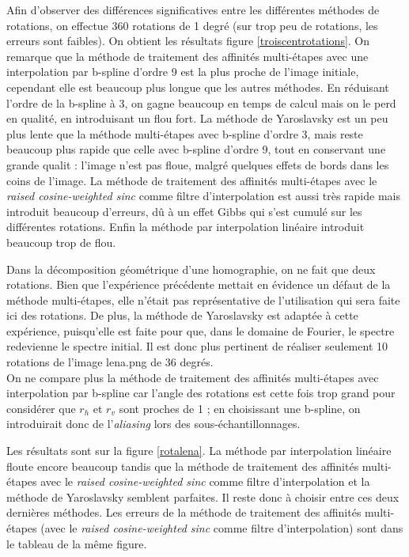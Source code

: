 	Afin d'observer des différences significatives entre les différentes méthodes de rotations, on effectue 360 rotations de 1 degré (sur trop peu de rotations, les erreurs sont faibles). On obtient les résultats figure \ref{troiscentrotations}.  On remarque que la méthode de traitement des affinités multi-étapes avec une interpolation par b-spline d'ordre 9 est la plus proche de l'image initiale, cependant elle est beaucoup plus longue que les autres méthodes. En réduisant l'ordre de la b-spline à 3, on gagne beaucoup en temps de calcul mais on le perd en qualité, en introduisant un flou fort. La méthode de Yaroslavsky est un peu plus lente que la méthode multi-étapes avec b-spline d'ordre 3, mais reste beaucoup plus rapide que celle avec b-spline d'ordre 9, tout en conservant une grande qualit : l'image n'est pas floue, malgré quelques effets de bords dans les coins de l'image. La méthode de traitement des affinités multi-étapes avec le \emph{raised cosine-weighted sinc} comme filtre d'interpolation est aussi très rapide mais introduit beaucoup d'erreurs, dû à un effet Gibbs qui s'est cumulé sur les différentes rotations. Enfin la méthode par interpolation linéaire introduit beaucoup trop de flou.\\
\label{pleinsderotations}
	
	Dans la décomposition géométrique d'une homographie, on ne fait que deux rotations. Bien que l'expérience précédente mettait en évidence un défaut de la méthode multi-étapes, elle n'était pas représentative de l'utilisation qui sera faite ici des rotations. De plus, la méthode de Yaroslavsky est adaptée à cette expérience, puisqu'elle est faite pour que, dans le domaine de Fourier, le spectre redevienne le spectre initial. Il est donc plus pertinent de réaliser seulement 10 rotations de l'image lena.png de 36 degrés.\\

	On ne compare plus la méthode de traitement des affinités multi-étapes avec interpolation par b-spline car l'angle des rotations est cette fois trop grand pour considérer que $r_h$ et $r_v$ sont proches de 1 ; en choisissant une b-spline, on introduirait donc de l'\emph{aliasing} lors des sous-échantillonnages.
	
	Les résultats sont sur la figure \ref{rotalena}. La méthode par interpolation linéaire floute encore beaucoup tandis que la méthode de traitement des affinités multi-étapes avec le \emph{raised cosine-weighted sinc} comme filtre d'interpolation et la méthode de Yaroslavsky semblent parfaites. Il reste donc à choisir entre ces deux dernières méthodes. Les erreurs de la méthode de traitement des affinités multi-étapes (avec le \emph{raised cosine-weighted sinc} comme filtre d'interpolation) sont dans le tableau de la même figure.\\

